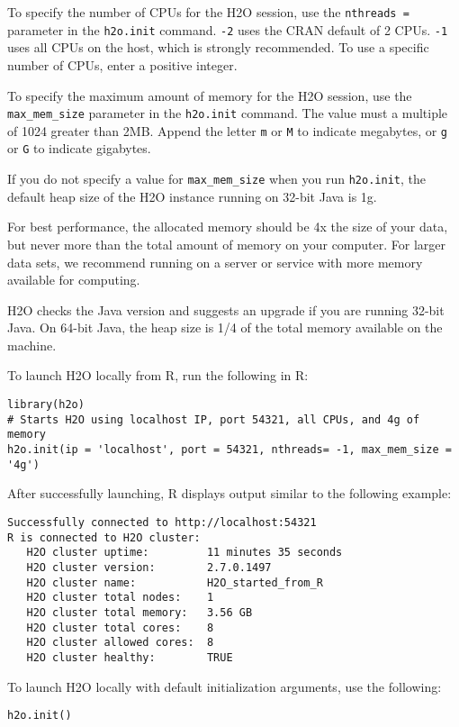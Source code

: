 {To specify the number of CPUs for the H2O session, use the \texttt{nthreads = } parameter in the \texttt{h2o.init} command. \texttt{-2} uses the CRAN default of 2 CPUs. \texttt{-1} uses 
all CPUs on the host, which is strongly recommended. To use a specific number of CPUs, enter a positive integer.

To specify the maximum amount of memory for the H2O session, use the {\texttt{max\_mem\_size}} parameter in the \texttt{h2o.init} command. The value must a multiple of 1024 greater than 2MB. Append the letter \texttt{m} or \texttt{M} to indicate megabytes, or \texttt{g} or \texttt{G} to indicate gigabytes. 

If you do not specify a value for {\texttt{max\_mem\_size}} when you run {\texttt{h2o.init}}, the default heap size of the H2O instance running on 32-bit Java is 1g. 

For best performance, the allocated memory should be 4x the size of your data, but never more than the total amount of memory on your computer. For larger data sets, we recommend running on a server or service with more memory available for computing.

H2O checks the Java version and suggests an upgrade if you are running 32-bit Java. On 64-bit Java, the heap size is 1/4 of the total memory available on the machine. 

To launch H2O locally from R, run the following in R:
\begin{lstlisting}[style=R]
library(h2o)
# Starts H2O using localhost IP, port 54321, all CPUs, and 4g of memory  
h2o.init(ip = 'localhost', port = 54321, nthreads= -1, max_mem_size = '4g')
\end{lstlisting}
\newpage
After successfully launching, R displays output similar to the following example: 
\begin{lstlisting}[style=R]
Successfully connected to http://localhost:54321
R is connected to H2O cluster:
   H2O cluster uptime:         11 minutes 35 seconds
   H2O cluster version:        2.7.0.1497 
   H2O cluster name:           H2O_started_from_R
   H2O cluster total nodes:    1
   H2O cluster total memory:   3.56 GB
   H2O cluster total cores:    8
   H2O cluster allowed cores:  8
   H2O cluster healthy:        TRUE
\end{lstlisting}

To launch H2O locally with default initialization arguments, use the following:
\begin{lstlisting}[style=R]
h2o.init()
\end{lstlisting}

}
